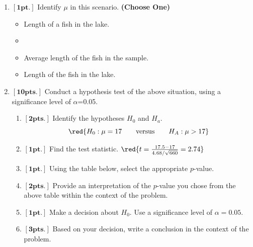   \begin{enumerate}
  \item $\mathbf{[1pt.]}$ Identify $\mu$ in this scenario. \textbf{(Choose One)}
  \begin{itemize}
  	\item Length of a fish in the lake.
  	\item {}
  	\item Average length of the fish in the sample.
  	\item Length of the fish in the lake.
  \end{itemize}
  \item $\mathbf{[10pts.]}$ Conduct a hypothesis test of the above situation, using a significance level of $\alpha$=0.05.
    \begin{enumerate}
    \item  $\mathbf{[2pts.]}$ Identify the hypotheses $H_0$ and $H_a$.
    $$\red{H_0: \mu = 17 \qquad \mbox{versus} \qquad H_A: \mu > 17}$$

    \item $\mathbf{[1pt.]}$  Find the test statistic.
    $\red{t = \frac{17.5-17}{4.68/\sqrt{660}} = 2.74}$
\item $\mathbf{[1pt.]}$ Using the table below, select the appropriate $p$-value.
\item $\mathbf{[2pts.]}$ Provide an interpretation of the $p$-value you chose from the above table within the context of the problem.\\


 \item $\mathbf{[1pt.]}$ Make a decision about $H_{0}$. Use a significance level of $\alpha = 0.05$.\\
\item $\mathbf{[3pts.]}$ Based on your decision, write a conclusion in the context of the problem.


    \end{enumerate}

  \end{enumerate}